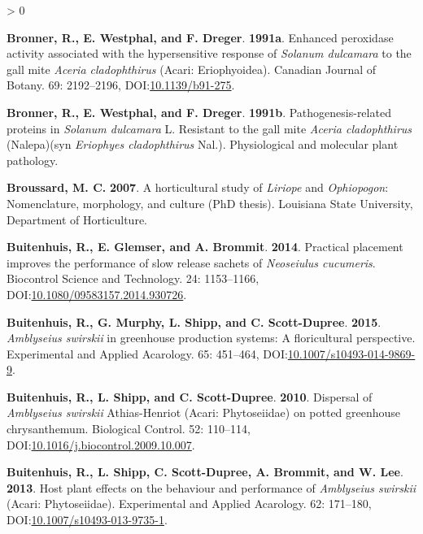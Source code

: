 \documentclass{ufdissertation}[overrideChapters] %
\newlength{\cslhangindent}
\newenvironment{CSLReferences}[2] %
 {%
  \setlength{\parindent}{0pt}
  \ifodd #1 \everypar{\setlength{\hangindent}{\cslhangindent}}\ignorespaces\fi
  \ifnum #2 > 0
  \setlength{\parskip}{#2\baselineskip}
  \fi
 }%
 {}
\begin{document}
{\begin{CSLReferences}{1}{1}
\leavevmode{}%
\textbf{Bronner, R., E. Westphal, and F. Dreger}. \textbf{1991a}. Enhanced peroxidase activity associated with the hypersensitive response of {\emph{Solanum dulcamara}} to the gall mite {\emph{Aceria cladophthirus}} ({Acari}: {Eriophyoidea}). Canadian Journal of Botany. 69: 2192--2196, DOI:\href{https://doi.org/10.1139/b91-275}{10.1139/b91-275}.

\leavevmode{}%
\textbf{Bronner, R., E. Westphal, and F. Dreger}. \textbf{1991b}. Pathogenesis-related proteins in {\emph{Solanum dulcamara}} {L.} Resistant to the gall mite {\emph{Aceria cladophthirus}} ({Nalepa})(syn {\emph{Eriophyes cladophthirus}} {Nal.}). Physiological and molecular plant pathology.

\leavevmode{}%
\textbf{Broussard, M. C.} \textbf{2007}. A horticultural study of {\emph{Liriope}} and {\emph{Ophiopogon}}: Nomenclature, morphology, and culture (PhD thesis). Louisiana State University, Department of Horticulture.

\leavevmode{}%
\textbf{Buitenhuis, R., E. Glemser, and A. Brommit}. \textbf{2014}. Practical placement improves the performance of slow release sachets of {\emph{Neoseiulus cucumeris}}. Biocontrol Science and Technology. 24: 1153--1166, DOI:\href{https://doi.org/10.1080/09583157.2014.930726}{10.1080/09583157.2014.930726}.

\leavevmode{}%
\textbf{Buitenhuis, R., G. Murphy, L. Shipp, and C. Scott-Dupree}. \textbf{2015}. {\emph{Amblyseius swirskii}} in greenhouse production systems: A floricultural perspective. Experimental and Applied Acarology. 65: 451--464, DOI:\href{https://doi.org/10.1007/s10493-014-9869-9}{10.1007/s10493-014-9869-9}.

\leavevmode{}%
\textbf{Buitenhuis, R., L. Shipp, and C. Scott-Dupree}. \textbf{2010}. Dispersal of {\emph{Amblyseius swirskii}} {Athias}-{Henriot} ({Acari}: {Phytoseiidae}) on potted greenhouse chrysanthemum. Biological Control. 52: 110--114, DOI:\href{https://doi.org/10.1016/j.biocontrol.2009.10.007}{10.1016/j.biocontrol.2009.10.007}.

\leavevmode{}%
\textbf{Buitenhuis, R., L. Shipp, C. Scott-Dupree, A. Brommit, and W. Lee}. \textbf{2013}. Host plant effects on the behaviour and performance of {\emph{Amblyseius swirskii}} ({Acari}: {Phytoseiidae}). Experimental and Applied Acarology. 62: 171--180, DOI:\href{https://doi.org/10.1007/s10493-013-9735-1}{10.1007/s10493-013-9735-1}.


\end{CSLReferences}}
\end{document}
